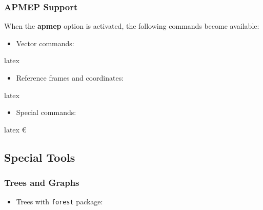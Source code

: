 \documentclass[
    margin=2cm
]{neoschool}
\begin{document}
\subsubsection{APMEP Support}

When the \textbf{apmep} option is activated, the following commands
become available:

\begin{itemize}
\item
  Vector commands:
\end{itemize}

\begin{code}{latex}
\end{code}

\begin{itemize}
\item
  Reference frames and coordinates:
\end{itemize}

\begin{code}{latex}
\Oij             %
\Oijk            %
\Ouv             %
\end{code}

\begin{itemize}
\item
  Special commands:
\end{itemize}

\begin{code}{latex}
\euro            %
\cg              %
\cd              %
\pg              %
\pp              %
\ds              %
\end{code}

\subsection{Special Tools}

\subsubsection{Trees and Graphs}

\begin{itemize}
\item
  Trees with \texttt{forest} package:
\end{itemize}
\end{document}
